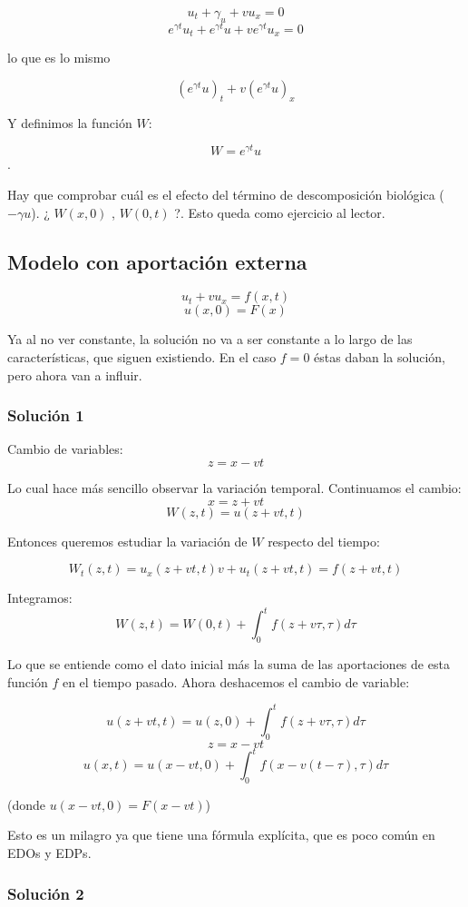 		$$u_t + \gamma_u + vu_x = 0$$
		$$e^{\gamma t} u_t + e^{\gamma t} u + v e^{ \gamma t} u_x = 0 $$

		lo que es lo mismo

		$$(e^{\gamma t}u)_t + v (e^{\gamma t} u)_x$$

		Y definimos la función $W$:

		$$W = e^{\gamma t}u$$.


		Hay que comprobar cuál es el efecto del término de descomposición biológica ($-\gamma u$). ¿ $W(x,0)$ , $ W(0,t)$ ?. Esto queda como ejercicio al lector.


	\subsection{Modelo con aportación externa}

		$$u_t + vu_x = f(x,t)$$
		$$u(x,0) = F(x)$$

		Ya al no ver constante, la solución no va a ser constante a lo largo de las características, que siguen existiendo. En el caso $f = 0$ éstas daban la solución, pero ahora van a influir.


		\subsubsection{Solución 1}

			Cambio de variables:
			$$z = x-vt$$

			Lo cual hace más sencillo observar la variación temporal. Continuamos el cambio:
			$$x = z + vt$$
			$$W(z,t) = u(z+vt, t)$$

			Entonces queremos estudiar la variación de $W$ respecto del tiempo:

			$$W_t(z,t) = u_x(z + vt, t)v + u_t(z+vt, t) = f(z + vt, t)$$

			Integramos:
			$$W(z,t) = W(0,t) + \int^{t}_{0} f(z+v\tau, \tau) d\tau $$

			Lo que se entiende como el dato inicial más la suma de las aportaciones de esta función $f$ en el tiempo pasado. Ahora deshacemos el cambio de variable:

			$$u(z + vt, t) = u(z,0) + \int^{t}_{0} f(z+v\tau, \tau) d\tau$$
			$$z = x-vt$$
			$$u(x,t) = u(x-vt,0)+ \int^{t}_{0} f(x-v(t-\tau),\tau) d\tau$$

			(donde $u(x-vt,0) = F(x-vt)$)

			Esto es un milagro ya que tiene una fórmula explícita, que es poco común en EDOs y EDPs.

		\subsubsection{Solución 2}

